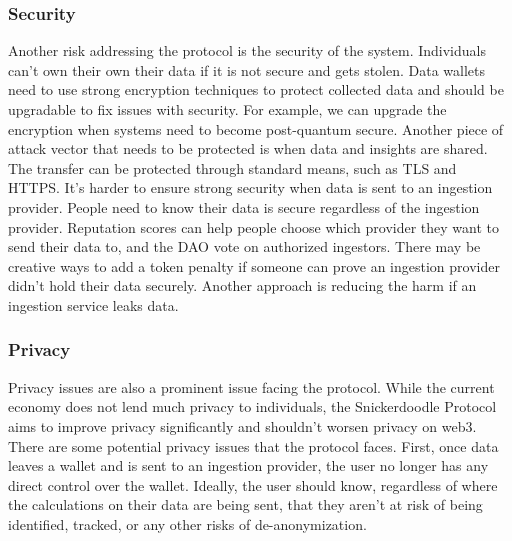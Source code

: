 \subsubsection{Security}
Another risk addressing the protocol is the security of the system. Individuals can't own their own their data if it is not secure and gets stolen. Data wallets need to use strong encryption techniques to protect collected data and should be upgradable to fix issues with security. For example, we can upgrade the encryption when systems need to become post-quantum secure. Another piece of attack vector that needs to be protected is when data and insights are shared. The transfer can be protected through standard means, such as TLS and HTTPS. It's harder to ensure strong security when data is sent to an ingestion provider. People need to know their data is secure regardless of the ingestion provider. Reputation scores can help people choose which provider they want to send their data to, and the DAO vote on authorized ingestors. There may be creative ways to add a token penalty if someone can prove an ingestion provider didn't hold their data securely. Another approach is reducing the harm if an ingestion service leaks data.

\subsubsection{Privacy}

Privacy issues are also a prominent issue facing the protocol. While the current economy does not lend much privacy to individuals, the Snickerdoodle Protocol aims to improve privacy significantly and shouldn't worsen privacy on web3. There are some potential privacy issues that the protocol faces. First, once data leaves a wallet and is sent to an ingestion provider, the user no longer has any direct control over the wallet. Ideally, the user should know, regardless of where the calculations on their data are being sent, that they aren't at risk of being identified, tracked, or any other risks of de-anonymization.  

